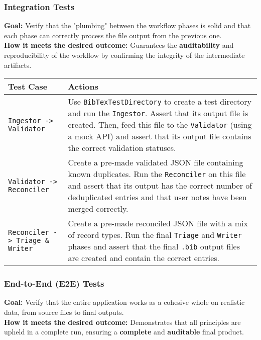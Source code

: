 \documentclass[11pt, a4paper]{article}
\begin{document}
\subsubsection{Integration Tests}
\textbf{Goal:} Verify that the "plumbing" between the workflow phases is solid and that each phase can correctly process the file output from the previous one. \\
\textbf{How it meets the desired outcome:} Guarantees the \textbf{auditability} and reproducibility of the workflow by confirming the integrity of the intermediate artifacts.

\begin{table}[h!]
\centering
\begin{tabular}{lp{}}
\toprule
\textbf{Test Case} & \textbf{Actions} \\
\midrule
\texttt{Ingestor -> Validator} &
Use \texttt{BibTexTestDirectory} to create a test directory and run the \texttt{Ingestor}. Assert that its output file is created. Then, feed this file to the \texttt{Validator} (using a mock API) and assert that its output file contains the correct validation statuses. \\
\addlinespace
\texttt{Validator -> Reconciler} &
Create a pre-made validated JSON file containing known duplicates. Run the \texttt{Reconciler} on this file and assert that its output has the correct number of deduplicated entries and that user notes have been merged correctly. \\
\addlinespace
\texttt{Reconciler -> Triage \& Writer} &
Create a pre-made reconciled JSON file with a mix of record types. Run the final \texttt{Triage} and \texttt{Writer} phases and assert that the final \texttt{.bib} output files are created and contain the correct entries. \\
\bottomrule
\end{tabular}
\end{table}

\subsubsection{End-to-End (E2E) Tests}
\textbf{Goal:} Verify that the entire application works as a cohesive whole on realistic data, from source files to final outputs. \\
\textbf{How it meets the desired outcome:} Demonstrates that all principles are upheld in a complete run, ensuring a \textbf{complete} and \textbf{auditable} final product.
\end{document}
